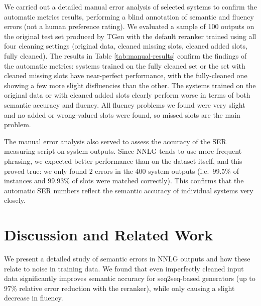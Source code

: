 \documentclass[11pt,a4paper]{article}
\begin{document}
We carried out a detailed manual error analysis of selected systems to confirm the automatic metrics results, performing a blind annotation of semantic and fluency errors (not a human preference rating).
We evaluated a sample of 100 outputs on the original test set produced by TGen with the default reranker trained using all four cleaning settings (original data, cleaned missing slots, cleaned added slots, fully cleaned).
The results in Table \ref{tab:manual-results} confirm the findings of the automatic metrics: systems trained on the fully cleaned set or the set with cleaned missing slots have near-perfect performance, with the fully-cleaned one showing a few more slight disfluencies than the other. The systems trained on the original data or with cleaned added slots clearly perform worse in terms of both semantic accuracy and fluency.
All fluency problems we found were very slight and no added or wrong-valued slots were found, so missed slots are the main problem.

The manual error analysis also served to assess the accuracy of the SER measuring script on system outputs. Since NNLG tends to use more frequent phrasing, we expected better performance than on the dataset itself, and this proved true: 
we only found 2 errors in the 400 system outputs (i.e.\ 99.5\% of instances and 99.93\% of slots were matched correctly).
This confirms that the automatic SER numbers reflect the semantic accuracy of individual systems very closely.


\section{Discussion and Related Work}

We present a detailed study
of semantic errors in NNLG outputs and how these relate to noise in training data.
We found that even imperfectly cleaned input data significantly improves semantic accuracy for seq2seq-based generators (up to 97\% relative error reduction with the reranker), while only causing a slight decrease  in fluency.
\end{document}
